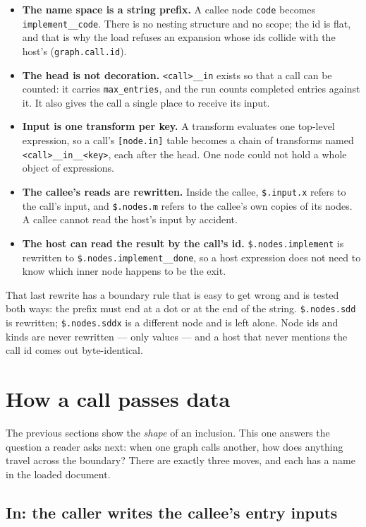 \begin{itemize}
	\item \textbf{The name space is a string prefix.} A callee node \texttt{code} becomes
	\texttt{implement\_\_code}. There is no nesting structure and no scope; the id is flat, and that is
	why the load refuses an expansion whose ids collide with the host's (\texttt{graph.call.id}).
	\item \textbf{The head is not decoration.} \texttt{<call>\_\_in} exists so that a call can be
	counted: it carries \texttt{max\_entries}, and the run counts completed entries against it. It also
	gives the call a single place to receive its input.
	\item \textbf{Input is one transform per key.} A transform evaluates one top-level expression, so
	a call's \texttt{[node.in]} table becomes a chain of transforms named
	\texttt{<call>\_\_in\_\_<key>}, each after the head. One node could not hold a whole object of
	expressions.
	\item \textbf{The callee's reads are rewritten.} Inside the callee, \texttt{\$.input.x} refers to
	the call's input, and \texttt{\$.nodes.m} refers to the callee's own copies of its nodes. A callee
	cannot read the host's input by accident.
	\item \textbf{The host can read the result by the call's id.} \texttt{\$.nodes.implement} is
	rewritten to \texttt{\$.nodes.implement\_\_done}, so a host expression does not need to know which
	inner node happens to be the exit.
\end{itemize}

That last rewrite has a boundary rule that is easy to get wrong and is tested both ways: the prefix
must end at a dot or at the end of the string. \texttt{\$.nodes.sdd} is rewritten;
\texttt{\$.nodes.sddx} is a different node and is left alone. Node ids and kinds are never rewritten
--- only values --- and a host that never mentions the call id comes out byte-identical.

\section{How a call passes data}

The previous sections show the \emph{shape} of an inclusion. This one answers the question a reader
asks next: when one graph calls another, how does anything travel across the boundary? There are
exactly three moves, and each has a name in the loaded document.

\subsection{In: the caller writes the callee's entry inputs}

